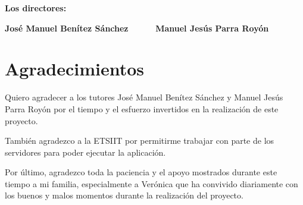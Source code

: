 
\textbf{Los directores:}

\vspace{5cm}

\noindent \textbf{José Manuel Benítez Sánchez \ \ \ \ \ Manuel Jesús Parra Royón}

\chapter*{Agradecimientos}
\thispagestyle{empty}

\vspace{1cm}


Quiero agradecer a los tutores José Manuel Benítez Sánchez y Manuel Jesús Parra Royón por el tiempo y el esfuerzo invertidos en la realización de este proyecto. 

También agradezco a la ETSIIT por permitirme trabajar con parte de los servidores para poder ejecutar la aplicación. 

Por último, agradezco toda la paciencia y el apoyo mostrados durante este tiempo a mi familia, especialmente a Verónica que ha convivido diariamente con los buenos y malos momentos durante la realización del proyecto. 

